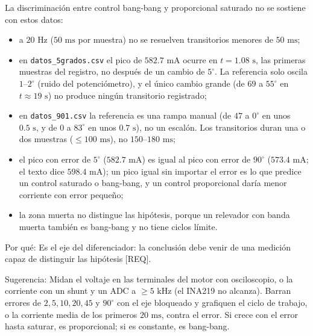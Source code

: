 \documentclass{LabDSTresponse}
\begin{document}
{La discriminación entre control bang-bang y proporcional saturado no se sostiene con estos datos:
\begin{itemize}
    \item a $20\text{ Hz}$ ($50\text{ ms}$ por muestra) no se resuelven transitorios menores de $50\text{ ms}$;
    \item en \texttt{datos\_5grados.csv} el pico de $582.7\text{ mA}$ ocurre en $t = 1.08\text{ s}$, las primeras muestras del registro, no después de un cambio de $5^\circ$. La referencia solo oscila $1\text{--}2^\circ$ (ruido del potenciómetro), y el único cambio grande (de $69$ a $55^\circ$ en $t \approx 19\text{ s}$) no produce ningún transitorio registrado;
    \item en \texttt{datos\_901.csv} la referencia es una rampa manual (de $47$ a $0^\circ$ en unos $0.5\text{ s}$, y de $0$ a $83^\circ$ en unos $0.7\text{ s}$), no un escalón. Los transitorios duran una o dos muestras ($\le 100\text{ ms}$), no $150\text{--}180\text{ ms}$;
    \item el pico con error de $5^\circ$ ($582.7\text{ mA}$) es igual al pico con error de $90^\circ$ ($573.4\text{ mA}$; el texto dice $598.4\text{ mA}$); un pico igual sin importar el error es lo que predice un control saturado o bang-bang, y un control proporcional daría menor corriente con error pequeño;
    \item la zona muerta no distingue las hipótesis, porque un relevador con banda muerta también es bang-bang y no tiene ciclos límite.
\end{itemize}
Por qué: Es el eje del diferenciador: la conclusión debe venir de una medición capaz de distinguir las hipótesis [REQ].

Sugerencia: Midan el voltaje en las terminales del motor con osciloscopio, o la corriente con un shunt y un ADC a $\ge 5\text{ kHz}$ (el INA219 no alcanza). Barran errores de $2, 5, 10, 20, 45$ y $90^\circ$ con el eje bloqueado y grafiquen el ciclo de trabajo, o la corriente media de los primeros $20\text{ ms}$, contra el error. Si crece con el error hasta saturar, es proporcional; si es constante, es bang-bang.}
\end{document}
